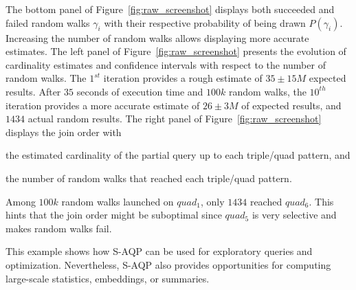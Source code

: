 \noindent The bottom panel of Figure~\ref{fig:raw_screenshot} displays
both succeeded and failed random walks $\gamma_i$ with their
respective probability of being drawn $P(\gamma_i)$.  Increasing the
number of random walks allows displaying more accurate estimates.  The
left panel of Figure~\ref{fig:raw_screenshot} presents the evolution
of cardinality estimates and confidence intervals with respect to the
number of random walks.  The $1^{st}$ iteration provides a rough
estimate of $35 \pm 15M$ expected results. After $35$ seconds of
execution time and $100k$ random walks, the $10^{th}$ iteration
provides a more accurate estimate of $26 \pm 3M$ of expected results,
and $1434$ actual random results.
%
The right panel of Figure~\ref{fig:raw_screenshot} displays
the join order with
\begin{inparaenum}[(i)]
\item the estimated cardinality of the partial query up to each
  triple/quad pattern, and
\item the number of random walks that reached each triple/quad pattern.
\end{inparaenum}
Among $100k$ random walks launched on $quad_1$, only $1434$ reached
$quad_6$. This hints that the join order might be suboptimal since
$quad_5$ is very selective and makes random walks fail.


\noindent This example shows how S-AQP can be used for exploratory
queries and optimization. Nevertheless, S-AQP also provides
opportunities for computing large-scale statistics, embeddings, or
summaries.


